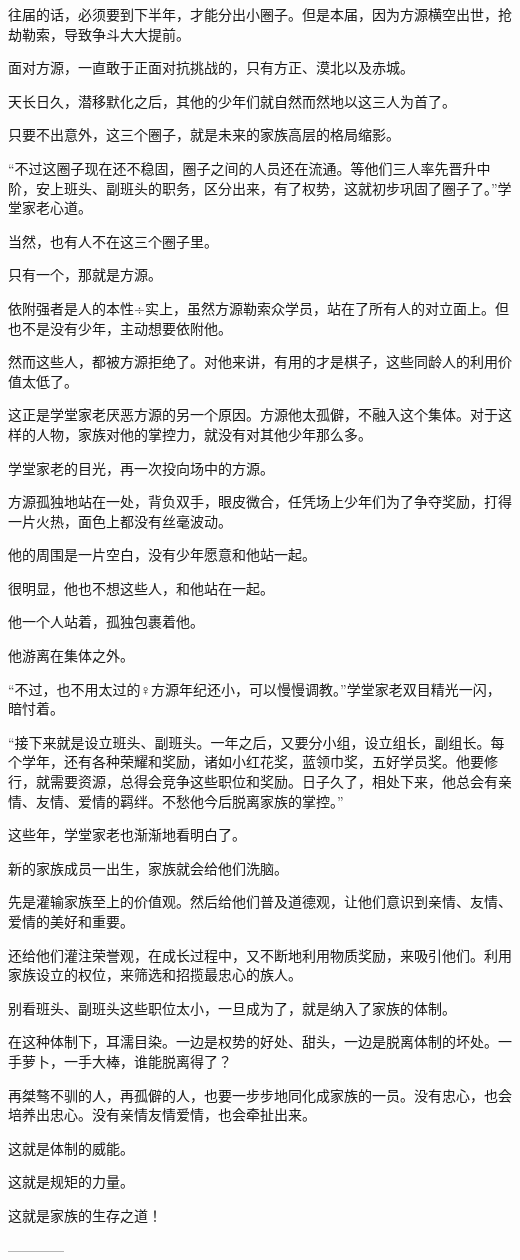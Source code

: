 \begin{this_body}
往届的话，必须要到下半年，才能分出小圈子。但是本届，因为方源横空出世，抢劫勒索，导致争斗大大提前。

面对方源，一直敢于正面对抗挑战的，只有方正、漠北以及赤城。

天长日久，潜移默化之后，其他的少年们就自然而然地以这三人为首了。

只要不出意外，这三个圈子，就是未来的家族高层的格局缩影。

“不过这圈子现在还不稳固，圈子之间的人员还在流通。等他们三人率先晋升中阶，安上班头、副班头的职务，区分出来，有了权势，这就初步巩固了圈子了。”学堂家老心道。

当然，也有人不在这三个圈子里。

只有一个，那就是方源。

依附强者是人的本性÷实上，虽然方源勒索众学员，站在了所有人的对立面上。但也不是没有少年，主动想要依附他。

然而这些人，都被方源拒绝了。对他来讲，有用的才是棋子，这些同龄人的利用价值太低了。

这正是学堂家老厌恶方源的另一个原因。方源他太孤僻，不融入这个集体。对于这样的人物，家族对他的掌控力，就没有对其他少年那么多。

学堂家老的目光，再一次投向场中的方源。

方源孤独地站在一处，背负双手，眼皮微合，任凭场上少年们为了争夺奖励，打得一片火热，面色上都没有丝毫波动。

他的周围是一片空白，没有少年愿意和他站一起。

很明显，他也不想这些人，和他站在一起。

他一个人站着，孤独包裹着他。

他游离在集体之外。

“不过，也不用太过的♀方源年纪还小，可以慢慢调教。”学堂家老双目精光一闪，暗忖着。

“接下来就是设立班头、副班头。一年之后，又要分小组，设立组长，副组长。每个学年，还有各种荣耀和奖励，诸如小红花奖，蓝领巾奖，五好学员奖。他要修行，就需要资源，总得会竞争这些职位和奖励。日子久了，相处下来，他总会有亲情、友情、爱情的羁绊。不愁他今后脱离家族的掌控。”

这些年，学堂家老也渐渐地看明白了。

新的家族成员一出生，家族就会给他们洗脑。

先是灌输家族至上的价值观。然后给他们普及道德观，让他们意识到亲情、友情、爱情的美好和重要。

还给他们灌注荣誉观，在成长过程中，又不断地利用物质奖励，来吸引他们。利用家族设立的权位，来筛选和招揽最忠心的族人。

别看班头、副班头这些职位太小，一旦成为了，就是纳入了家族的体制。

在这种体制下，耳濡目染。一边是权势的好处、甜头，一边是脱离体制的坏处。一手萝卜，一手大棒，谁能脱离得了？

再桀骜不驯的人，再孤僻的人，也要一步步地同化成家族的一员。没有忠心，也会培养出忠心。没有亲情友情爱情，也会牵扯出来。

这就是体制的威能。

这就是规矩的力量。

这就是家族的生存之道！

------------

\end{this_body}

